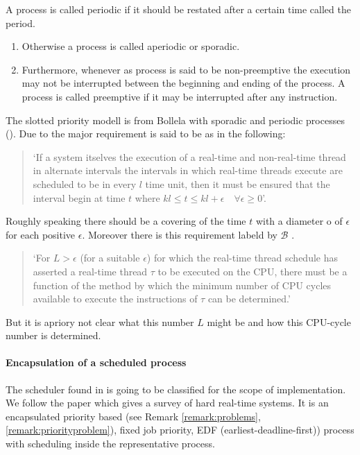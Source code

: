\begin{definition}
	 A process is called periodic if it should be restated after a certain time called the period.
	 \begin{enumerate}[label=(\roman*)] 
	\item Otherwise a process is called aperiodic or sporadic.
	\item Furthermore, whenever as process is said to be non-preemptive the execution may not be interrupted between the beginning and ending of the process. 
		A process is called preemptive if it may be interrupted after any instruction.
	\end{enumerate}
	\end{definition}  
 
The slotted priority modell is from Bollela \cite{B97} with  sporadic and periodic processes (\cite{K}).
Due to \cite{B97} the major requirement is said to be as in the following:

\begin{quote}
	`If a system itselves the execution of a real-time and non-real-time thread in alternate intervals the intervals in which real-time threads execute are scheduled to be in every $l$ time unit, then it must be ensured that the interval begin at time $t$ where $kl \leq t \leq kl+\epsilon \quad \forall
 \epsilon \geq 0$'.
\end{quote}

Roughly speaking there should be a covering of the time $t$ with a diameter o
of $\epsilon$ for each positive $\epsilon$.
Moreover there is this requirement labeld by  $\mathcal{B}$ \cite{B97}.
\begin{quote}
	`For $L>\epsilon$ (for a suitable $\epsilon$) for which the real-time thread schedule has asserted a real-time thread $\tau$ to be executed on the CPU, there must be a function of the method by which the minimum number of CPU cycles available to execute the instructions of $\tau$ can be determined.'
\end{quote}
But it is apriory not clear what this number $L$ might be and how this CPU-cycle number is determined.


\paragraph*{Encapsulation of a scheduled process}
 
	The scheduler found in \cite{K} is going to be classified for the scope of implementation. 
	We follow the paper \cite{DB2011} which gives a survey of hard real-time 	systems.
	It is an encapsulated priority based (see Remark \ref{remark:problems}, \ref{remark:priorityproblem}), fixed job priority,   EDF (earliest-deadline-first)) process with scheduling inside the representative process.

